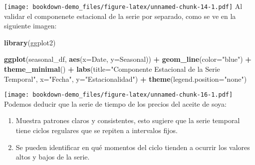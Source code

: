 \documentclass[
]{book}
\newenvironment{Shaded}{\begin{snugshade}}{\end{snugshade}}
\newcommand{\AttributeTok}[1]{\textcolor[rgb]{0.13,0.29,0.53}{#1}}
\newcommand{\CommentTok}[1]{\textcolor[rgb]{0.56,0.35,0.01}{\textit{#1}}}
\newcommand{\FunctionTok}[1]{\textcolor[rgb]{0.13,0.29,0.53}{\textbf{#1}}}
\newcommand{\NormalTok}[1]{#1}
\newcommand{\OtherTok}[1]{\textcolor[rgb]{0.56,0.35,0.01}{#1}}
\newcommand{\SpecialCharTok}[1]{\textcolor[rgb]{0.81,0.36,0.00}{\textbf{#1}}}
\newcommand{\StringTok}[1]{\textcolor[rgb]{0.31,0.60,0.02}{#1}}
\begin{document}
\texttt{[image: bookdown-demo\_files/figure-latex/unnamed-chunk-14-1.pdf]}
Al validar el componenete estacional de la serie por separado, como se ve en la siguiente imagen:

\begin{Shaded}
\end{Shaded}

\begin{Shaded}
\begin{Highlighting}[]
\FunctionTok{library}\NormalTok{(ggplot2)}

\FunctionTok{ggplot}\NormalTok{(seasonal\_df, }\FunctionTok{aes}\NormalTok{(}\AttributeTok{x=}\NormalTok{Date, }\AttributeTok{y=}\NormalTok{Seasonal)) }\SpecialCharTok{+}
  \FunctionTok{geom\_line}\NormalTok{(}\AttributeTok{color=}\StringTok{"blue"}\NormalTok{) }\SpecialCharTok{+}
  \FunctionTok{theme\_minimal}\NormalTok{() }\SpecialCharTok{+}
  \FunctionTok{labs}\NormalTok{(}\AttributeTok{title=}\StringTok{"Componente Estacional de la Serie Temporal"}\NormalTok{, }\AttributeTok{x=}\StringTok{"Fecha"}\NormalTok{, }\AttributeTok{y=}\StringTok{"Estacionalidad"}\NormalTok{) }\SpecialCharTok{+}
  \FunctionTok{theme}\NormalTok{(}\AttributeTok{legend.position=}\StringTok{"none"}\NormalTok{)}
\end{Highlighting}
\end{Shaded}

\texttt{[image: bookdown-demo\_files/figure-latex/unnamed-chunk-16-1.pdf]}
Podemos deducir que la serie de tiempo de los precios del aceite de soya:

\begin{enumerate}
\def\labelenumi{\arabic{enumi}.}
\item
  Muestra patrones claros y consistentes, esto sugiere que la serie temporal tiene ciclos regulares que se repiten a intervalos fijos.
\item
  Se pueden identificar en qué momentos del ciclo tienden a ocurrir los valores altos y bajos de la serie.
\end{enumerate}
\end{document}
